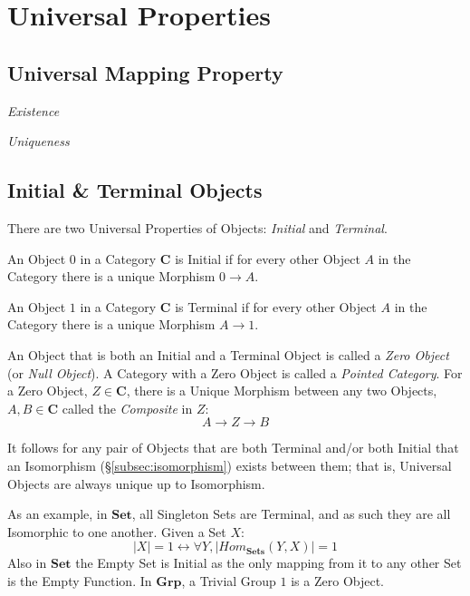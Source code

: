 \section{Universal Properties}\label{sec:universal_property}

\subsection{Universal Mapping Property}
\label{subsec:universal_mapping_property}

\emph{Existence}

\emph{Uniqueness}



\subsection{Initial \& Terminal Objects}\label{subsec:initial_terminal}

There are two Universal Properties of Objects: \emph{Initial} and
\emph{Terminal}.

An Object $0$ in a Category $\mathbf{C}$ is Initial if for every other
Object $A$ in the Category there is a unique Morphism $0 \rightarrow
A$.

An Object $1$ in a Category $\mathbf{C}$ is Terminal if for every
other Object $A$ in the Category there is a unique Morphism $A
\rightarrow 1$.

An Object that is both an Initial and a Terminal Object is called a
\emph{Zero Object} (or \emph{Null Object}). A Category with a Zero
Object is called a \emph{Pointed Category}. For a Zero Object, $Z \in
\mathbf{C}$, there is a Unique Morphism between any two Objects, $A, B
\in \mathbf{C}$ called the \emph{Composite} in $Z$:
\[
    A \rightarrow Z \rightarrow B
\]

It follows for any pair of Objects that are both Terminal and/or both
Initial that an Isomorphism (\S\ref{subsec:isomorphism}) exists
between them; that is, Universal Objects are always unique up to
Isomorphism.

As an example, in $\mathbf{Set}$, all Singleton Sets are Terminal, and
as such they are all Isomorphic to one another. Given a Set $X$:
\[
    |X| = 1 \leftrightarrow \forall Y, |Hom_{\mathbf{Sets}}(Y,X)| = 1
\]
Also in $\mathbf{Set}$ the Empty Set is Initial as the only mapping
from it to any other Set is the Empty Function. In $\mathbf{Grp}$, a
Trivial Group ${1}$ is a Zero Object.



